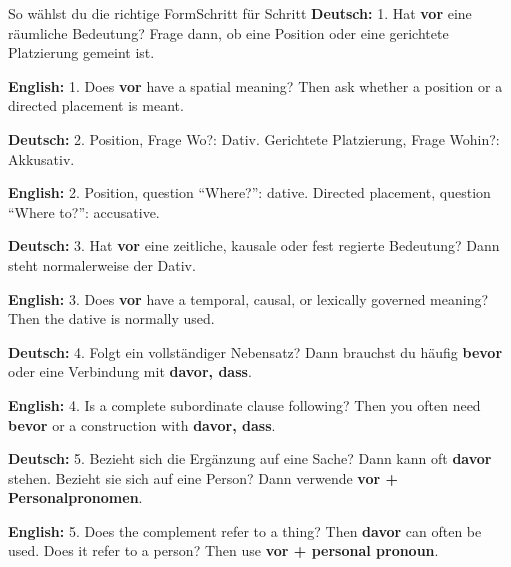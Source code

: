 \documentclass[a4paper,11pt]{article}
\newcommand{\GermanText}[1]{\textbf{Deutsch: }#1\par}
\newcommand{\EnglishText}[1]{{\small\color{SoftGray}\textbf{English: }#1\par}}
\begin{document}
        \begin{grammarentry}{So wählst du die richtige Form}{Schritt für Schritt}
            \GermanText{1. Hat \textbf{vor} eine räumliche Bedeutung? Frage dann, ob eine Position oder eine gerichtete Platzierung gemeint ist.}
            \EnglishText{1. Does \textbf{vor} have a spatial meaning? Then ask whether a position or a directed placement is meant.}

            \GermanText{2. Position, Frage \glqq Wo?\grqq: Dativ. Gerichtete Platzierung, Frage \glqq Wohin?\grqq: Akkusativ.}
            \EnglishText{2. Position, question ``Where?'': dative. Directed placement, question ``Where to?'': accusative.}

            \GermanText{3. Hat \textbf{vor} eine zeitliche, kausale oder fest regierte Bedeutung? Dann steht normalerweise der Dativ.}
            \EnglishText{3. Does \textbf{vor} have a temporal, causal, or lexically governed meaning? Then the dative is normally used.}

            \GermanText{4. Folgt ein vollständiger Nebensatz? Dann brauchst du häufig \textbf{bevor} oder eine Verbindung mit \textbf{davor, dass}.}
            \EnglishText{4. Is a complete subordinate clause following? Then you often need \textbf{bevor} or a construction with \textbf{davor, dass}.}

            \GermanText{5. Bezieht sich die Ergänzung auf eine Sache? Dann kann oft \textbf{davor} stehen. Bezieht sie sich auf eine Person? Dann verwende \textbf{vor + Personalpronomen}.}
            \EnglishText{5. Does the complement refer to a thing? Then \textbf{davor} can often be used. Does it refer to a person? Then use \textbf{vor + personal pronoun}.}
        \end{grammarentry}



\end{document}
